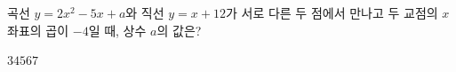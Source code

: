 곡선 $y=2x^2-5x+a$와 직선 $y=x+12$가 서로 다른 두 점에서 만나고 두 교점의 $x$좌표의 곱이 $-4$일 때, 상수 $a$의 값은?
\begin{choices32}{$3$}{$4$}{$5$}{$6$}{$7$}\end{choices32}
